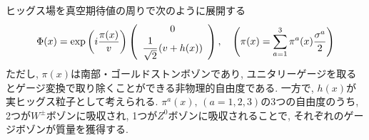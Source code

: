 ヒッグス場を真空期待値の周りで次のように展開する
\begin{align}
  \Phi(x) = \exp\left(i\frac{\pi(x)}{v}\right)\left(
  \begin{array}{c}
    0 \\
    \cfrac{1}{\sqrt{2}}\left(v + h(x)\right)
  \end{array}
\right),\quad \left(\pi(x) = \sum_{a=1}^3\pi^a(x)\frac{\sigma^a}{2}\right)\label{higgs}
\end{align}
ただし, $\pi(x)$は南部・ゴールドストンボゾンであり, ユニタリーゲージを取るとゲージ変換で取り除くことができる非物理的自由度である.
一方で, $h(x)$が実ヒッグス粒子として考えられる.
$\pi^a(x),\,(a=1,2,3)$の3つの自由度のうち,  2つが$W^\pm$ボゾンに吸収され, 1つが$Z^0$ボゾンに吸収されることで, それぞれのゲージボゾンが質量を獲得する.

